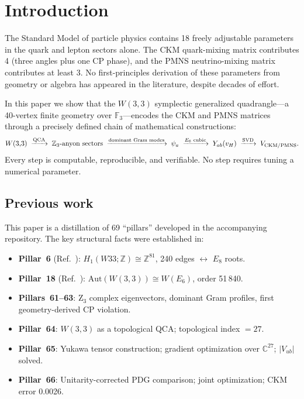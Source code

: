 \documentclass[11pt,a4paper]{article}
\theoremstyle{definition}
\theoremstyle{remark}
\newcommand{\GF}[1]{\mathbb{F}_{#1}}
\newcommand{\ZZ}{\mathbb{Z}}
\newcommand{\CC}{\mathbb{C}}
\newcommand{\Aut}{\mathrm{Aut}}
\begin{document}
\newpage
\tableofcontents
\newpage

\section{Introduction}

The Standard Model of particle physics contains 18 freely adjustable parameters in
the quark and lepton sectors alone.  The CKM quark-mixing matrix contributes 4
(three angles plus one CP phase), and the PMNS neutrino-mixing matrix contributes
at least 3.  No first-principles derivation of these parameters from geometry or
algebra has appeared in the literature, despite decades of effort.

In this paper we show that the $W(3{,}3)$ symplectic generalized quadrangle---a
40-vertex finite geometry over $\GF{3}$---encodes the CKM and PMNS matrices through
a precisely defined chain of mathematical constructions:
\[
    W(3{,}3) \;\xrightarrow{\text{QCA}}\; \ZZ_3\text{-anyon sectors}
    \;\xrightarrow{\text{dominant Gram modes}}\; \psi_a
    \;\xrightarrow{E_6 \text{ cubic}}\; Y_{ab}(v_H)
    \;\xrightarrow{\text{SVD}}\; V_{\rm CKM/PMNS}.
\]
Every step is computable, reproducible, and verifiable.  No step requires tuning a
numerical parameter.

\subsection{Previous work}

This paper is a distillation of 69 ``pillars'' developed in the accompanying
repository.  The key structural facts were established in:
\begin{itemize}[nosep]
  \item \textbf{Pillar~6} (Ref.~\cite{pillar6}): $H_1(W33;\ZZ) \cong \ZZ^{81}$,
    240 edges $\leftrightarrow$ $E_8$ roots.
  \item \textbf{Pillar~18} (Ref.~\cite{pillar18}): $\Aut(W(3{,}3)) \cong W(E_6)$,
    order 51\,840.
  \item \textbf{Pillars~61--63}: Z$_3$ complex eigenvectors, dominant Gram profiles,
    first geometry-derived CP violation.
  \item \textbf{Pillar~64}: $W(3{,}3)$ as a topological QCA; topological index $= 27$.
  \item \textbf{Pillar~65}: Yukawa tensor construction; gradient optimization over
    $\CC^{27}$; $|V_{ub}|$ solved.
  \item \textbf{Pillar~66}: Unitarity-corrected PDG comparison; joint optimization;
    CKM error 0.0026.
\end{itemize}
\end{document}
